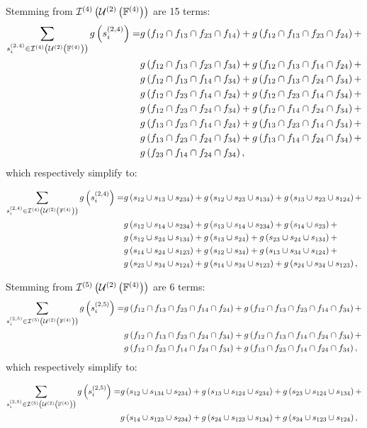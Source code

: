 \documentclass[11pt]{article}
\newcommand{\gxn}[1]{g\left(#1\right)}
\newcommand{\smem}[2]{s^{\left(#1\right)}_{#2}}
\begin{document}
Stemming from $\mathcal{I}^{(4)}\left(\mathcal{U}^{(2)}\left(\mathbb{F}^{(4)}\right)\right)$ are 15 terms:
\begin{align}
	\sum_{\smem{2,4}{i}\in\intsset{4}{2}{4}}\gxn{\smem{2,4}{i}} =
	  & \gxn{\IDiDjDkDl} + \gxn{\IDiDjDkDm} + \nonumber\\
	  & \gxn{\IDiDjDkDn} + \gxn{\IDiDjDlDm} + \nonumber\\
	  & \gxn{\IDiDjDlDn} + \gxn{\IDiDjDmDn} + \nonumber\\
	  & \gxn{\IDiDkDlDm} + \gxn{\IDiDkDlDn} + \nonumber\\
	  & \gxn{\IDiDkDmDn} + \gxn{\IDiDlDmDn} + \nonumber\\
	  & \gxn{\IDjDkDlDm} + \gxn{\IDjDkDlDn} + \nonumber\\
	  & \gxn{\IDjDkDmDn} + \gxn{\IDjDlDmDn} + \nonumber\\
	  & \gxn{\IDkDlDmDn},
\end{align}
which respectively simplify to:

\begin{align}
	\sum_{\smem{2,4}{i}\in\intsset{4}{2}{4}}\gxn{\smem{2,4}{i}} =
	& \gxn{\Ii\cup\Ij\cup\Ill} + \gxn{\Ii\cup\Ik\cup\Ikk} +
	  \gxn{\Ij\cup\Ik\cup\Ijj} + \nonumber\\
	& \gxn{\Ii\cup\Il\cup\Ill} + \gxn{\Ij\cup\Il\cup\Ill} +
	  \gxn{\Il\cup\Ik} + \nonumber\\
	& \gxn{\Ii\cup\In\cup\Ikk} + \gxn{\Ij\cup\In} +
	  \gxn{\Ik\cup\In\cup\Ikk} + \nonumber\\
	& \gxn{\Il\cup\In\cup\Iii} + \gxn{\Ii\cup\Io} +
	  \gxn{\Ij\cup\Io\cup\Ijj} + \nonumber\\
	& \gxn{\Ik\cup\Io\cup\Ijj} + \gxn{\Il\cup\Io\cup\Iii} +
	  \gxn{\In\cup\Io\cup\Iii},
\end{align}

Stemming from $\mathcal{I}^{(5)}\left(\mathcal{U}^{(2)}\left(\mathbb{F}^{(4)}\right)\right)$ are 6 terms:
\begin{align}
	\sum_{\smem{2,5}{i}\in\intsset{5}{2}{4}}\gxn{\smem{2,5}{i}} =
 	  & \gxn{\IDiDjDkDlDm} + \gxn{\IDiDjDkDlDn} + \nonumber\\
	  & \gxn{\IDiDjDkDmDn} + \gxn{\IDiDjDlDmDn} + \nonumber\\
	  & \gxn{\IDiDkDlDmDn} + \gxn{\IDjDkDlDmDn},
\end{align}
which respectively simplify to:

\begin{align}
	\sum_{\smem{2,5}{i}\in\intsset{5}{2}{4}}\gxn{\smem{2,5}{i}} =
	& \gxn{\Ii\cup\Ikk\cup\Ill} + \gxn{\Ij\cup\Ijj\cup\Ill} +
	  \gxn{\Ik\cup\Ijj\cup\Ikk} + \nonumber\\
	& \gxn{\Il\cup\Iii\cup\Ill} + \gxn{\In\cup\Iii\cup\Ikk} +
	  \gxn{\Io\cup\Iii\cup\Ijj},
\end{align}
\end{document}
